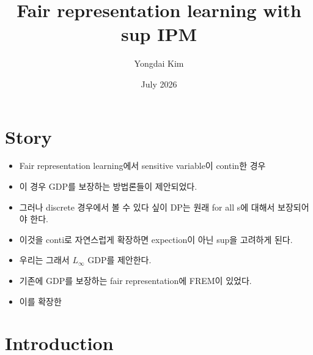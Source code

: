 \documentclass{article}
\title{Fair representation learning with sup IPM}
\author{Yongdai Kim}
\date{July 2026}
\begin{document}
\maketitle


\section{Story}

\begin{itemize}
    \item Fair representation learning에서 sensitive variable이 contin한 경우
    \item 이 경우 GDP를 보장하는 방법론들이 제안되었다.
    \item 그러나 discrete 경우에서 볼 수 있다 싶이 DP는 원래 for all s에 대해서 보장되어야 한다.
    \item 이것을 conti로 자연스럽게 확장하면 expection이 아닌 sup을 고려하게 된다.
    \item 우리는 그래서 $L_{\infty}$ GDP를 제안한다.
    \item 기존에 GDP를 보장하는 fair representation에 FREM이 있었다.
    \item 이를 확장한
\end{itemize}

\section{Introduction}
\end{document}
